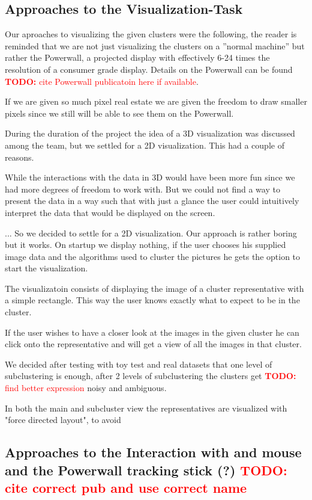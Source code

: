 \documentclass[journal]{vgtc}       %
\newcommand{\todo}[1]{\textcolor{red}{\textbf{TODO:} #1}}
\begin{document}
\subsection{Approaches to the Visualization-Task}

Our aproaches to visualizing the given clusters were the following, the reader is reminded that we are not just visualizing the clusters on a ''normal machine'' but rather the Powerwall, a projected display with effectively 6-24 times the resolution of a consumer grade display. Details on the Powerwall can be found \todo{cite Powerwall publicatoin here if available}. \cite{Powerwall}

If we are given so much pixel real estate we are given the freedom to draw smaller pixels since we still will be able to see them on the Powerwall.

During the duration of the project the idea of a 3D visualization was discussed among the team, but we settled for a 2D visualization. This had a couple of reasons.

While the interactions with the data in 3D would have been more fun since we had more degrees of freedom to work with.
But we could not find a way to present the data in a way such that with just a glance the user could intuitively interpret the data that would be displayed on the screen.

... So we decided to settle for a 2D visualization. Our approach is rather boring but it works. On startup we display nothing, if the user chooses his supplied image data and the algorithms used to cluster the pictures he gets the option to start the visualization.

The visualizatoin consists of displaying the image of a cluster representative with a simple rectangle. 
This way the user knows exactly what to expect to be in the cluster.

If the user wishes to have a closer look at the images in the given cluster he can click onto the representative and will get a view of all the images in that cluster.

We decided after testing with toy test and real datasets that one level of subclustering is enough, after 2 levels of subclustering the clusters get \todo{find better expression}  noisy and ambiguous.

In both the main and subcluster view the representatives are visualized with "force directed layout", to avoid 



\subsection{Approaches to the Interaction with and mouse and the Powerwall tracking stick (?) \todo{cite correct pub and use correct name}}
\end{document}
